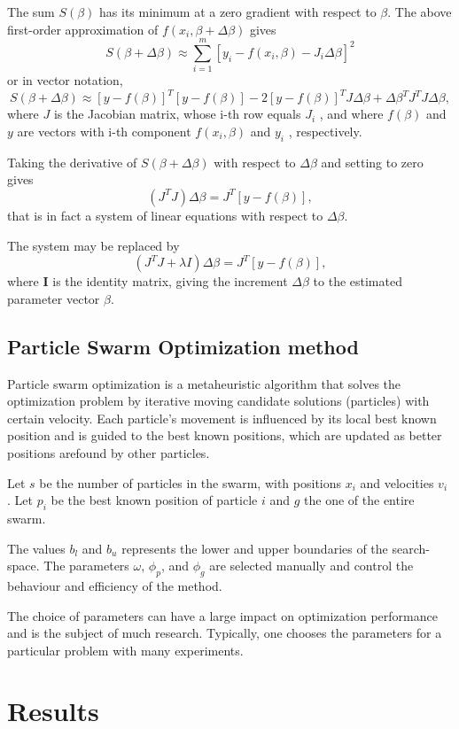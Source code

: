 \documentclass[a4paper,article,14pt]{extarticle}
\begin{document}
	The sum $S(\beta)$ has its minimum at a zero gradient with respect to $\beta$. The above first-order approximation of $f(x_i, \beta + \Delta \beta)$ gives $$S(\beta + \Delta \beta) \approx \sum_{i=1}^{m} [y_i - f(x_i, \beta) - J_i\Delta \beta]^2$$ or in vector notation, $$S(\beta+ \Delta \beta)\approx[y - f(\beta)]^T [y-f(\beta)]-2[y-f(\beta)]^T J\Delta \beta + \Delta \beta^T J^T J \Delta \beta,$$ where $J$ is the Jacobian matrix, whose i-th row equals $J_i$ , and where $f(\beta)$ and $y$ are vectors with i-th component $f(x_i, \beta)$ and $y_i$ , respectively.
	
	Taking the derivative of $S (\beta + \Delta \beta)$ with respect to $\Delta \beta$ and setting to zero gives $$(J^T J) \Delta \beta = J^T [y - f(\beta)],$$ that is in fact a system of linear equations with respect to $\Delta \beta$.
	
	The system may be replaced by $$(J^T J + \lambda I) \Delta \beta = J^T [y-f(\beta)],$$ where \textbf{I} is the identity matrix, giving the increment $\Delta \beta$ to the estimated parameter vector $\beta$.
	
	\subsection{Particle Swarm Optimization method}
	Particle swarm optimization is a metaheuristic algorithm that solves the optimization problem by iterative moving candidate solutions (particles) with certain velocity. Each particle’s movement is influenced by its local best known position and is guided to the best known positions, which are updated as better positions arefound by other particles.
	
	Let $s$ be the number of particles in the swarm, with positions $x_i$ and velocities $v_i$ . Let $p_i$ be the best known position of particle $i$ and $g$ the one of the entire swarm.
	
	The values $b_l$ and $b_u$ represents the lower and upper boundaries of the search-space. The parameters $\omega$, $\phi_p$, and $\phi_g$ are selected manually and control the behaviour and efficiency of the method.
	
	The choice of parameters can have a large impact on optimization performance and is the subject of much research. Typically, one chooses the parameters for a particular problem with many experiments.
	
	\section{Results}
	
\end{document}
